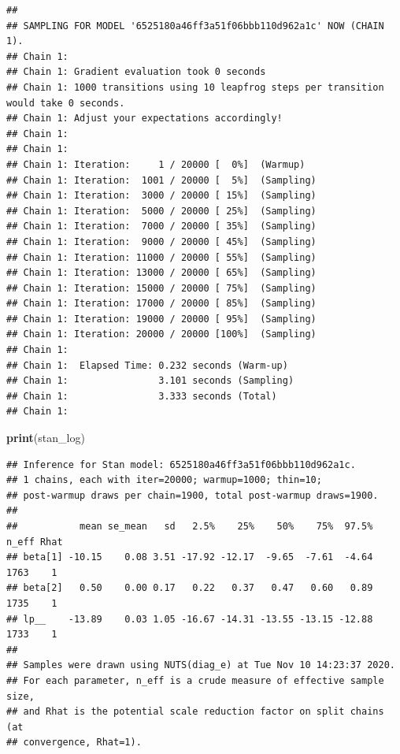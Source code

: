 \documentclass[
]{book}
\newenvironment{Shaded}{\begin{snugshade}}{\end{snugshade}}
\newcommand{\KeywordTok}[1]{\textcolor[rgb]{0.13,0.29,0.53}{\textbf{#1}}}
\newcommand{\NormalTok}[1]{#1}
\begin{document}
\begin{verbatim}
## 
## SAMPLING FOR MODEL '6525180a46ff3a51f06bbb110d962a1c' NOW (CHAIN 1).
## Chain 1: 
## Chain 1: Gradient evaluation took 0 seconds
## Chain 1: 1000 transitions using 10 leapfrog steps per transition would take 0 seconds.
## Chain 1: Adjust your expectations accordingly!
## Chain 1: 
## Chain 1: 
## Chain 1: Iteration:     1 / 20000 [  0%]  (Warmup)
## Chain 1: Iteration:  1001 / 20000 [  5%]  (Sampling)
## Chain 1: Iteration:  3000 / 20000 [ 15%]  (Sampling)
## Chain 1: Iteration:  5000 / 20000 [ 25%]  (Sampling)
## Chain 1: Iteration:  7000 / 20000 [ 35%]  (Sampling)
## Chain 1: Iteration:  9000 / 20000 [ 45%]  (Sampling)
## Chain 1: Iteration: 11000 / 20000 [ 55%]  (Sampling)
## Chain 1: Iteration: 13000 / 20000 [ 65%]  (Sampling)
## Chain 1: Iteration: 15000 / 20000 [ 75%]  (Sampling)
## Chain 1: Iteration: 17000 / 20000 [ 85%]  (Sampling)
## Chain 1: Iteration: 19000 / 20000 [ 95%]  (Sampling)
## Chain 1: Iteration: 20000 / 20000 [100%]  (Sampling)
## Chain 1: 
## Chain 1:  Elapsed Time: 0.232 seconds (Warm-up)
## Chain 1:                3.101 seconds (Sampling)
## Chain 1:                3.333 seconds (Total)
## Chain 1:
\end{verbatim}

\begin{Shaded}
\begin{Highlighting}[]
\KeywordTok{print}\NormalTok{(stan_log)}
\end{Highlighting}
\end{Shaded}

\begin{verbatim}
## Inference for Stan model: 6525180a46ff3a51f06bbb110d962a1c.
## 1 chains, each with iter=20000; warmup=1000; thin=10; 
## post-warmup draws per chain=1900, total post-warmup draws=1900.
## 
##           mean se_mean   sd   2.5%    25%    50%    75%  97.5% n_eff Rhat
## beta[1] -10.15    0.08 3.51 -17.92 -12.17  -9.65  -7.61  -4.64  1763    1
## beta[2]   0.50    0.00 0.17   0.22   0.37   0.47   0.60   0.89  1735    1
## lp__    -13.89    0.03 1.05 -16.67 -14.31 -13.55 -13.15 -12.88  1733    1
## 
## Samples were drawn using NUTS(diag_e) at Tue Nov 10 14:23:37 2020.
## For each parameter, n_eff is a crude measure of effective sample size,
## and Rhat is the potential scale reduction factor on split chains (at 
## convergence, Rhat=1).
\end{verbatim}
\end{document}
